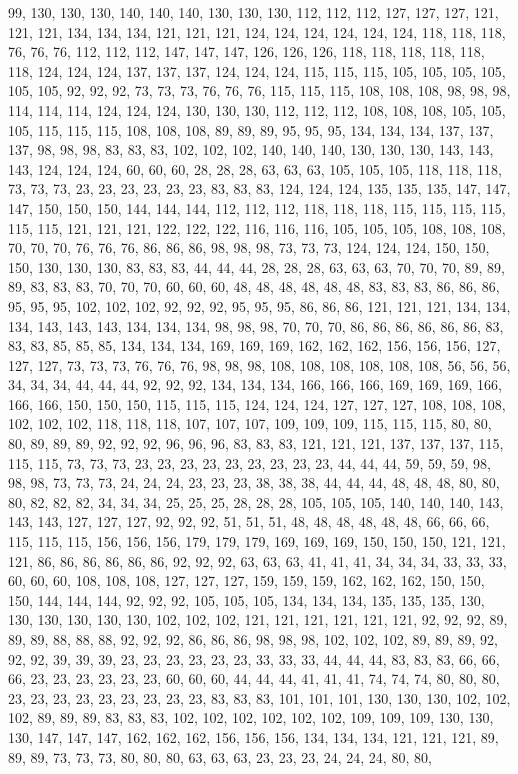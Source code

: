 99, 130, 130, 130, 140, 140, 140, 130, 130, 130, 112, 112, 112, 127, 127, 127, 121, 121, 121, 134, 134, 134, 121, 121, 121, 124, 124, 124, 124, 124, 124, 118, 118, 118, 76, 76, 76, 112, 112, 112, 147, 147, 147, 126, 126, 126, 118, 118, 118, 118, 118, 118, 124, 124, 124, 137, 137, 137, 124, 124, 124, 115, 115, 115, 105, 105, 105, 105, 105, 105, 92, 92, 92, 73, 73, 73, 76, 76, 76, 115, 115, 115, 108, 108, 108, 98, 98, 98, 114, 114, 114, 124, 124, 124, 130, 130, 130, 112, 112, 112, 108, 108, 108, 105, 105, 105, 115, 115, 115, 108, 108, 108, 89, 89, 89, 95, 95, 95, 134, 134, 134, 137, 137, 137, 98, 98, 98, 83, 83, 83, 102, 102, 102, 140, 140, 140, 130, 130, 130, 143, 143, 143, 124, 124, 124, 60, 60, 60, 28, 28, 28, 63, 63, 63, 105, 105, 105, 118, 118, 118, 73, 73, 73, 23, 23, 23, 23, 23, 23, 83, 83, 83, 124, 124, 124, 135, 135, 135, 147, 147, 147, 150, 150, 150, 144, 144, 144, 112, 112, 112, 118, 118, 118, 115, 115, 115, 115, 115, 115, 121, 121, 121, 122, 122, 122, 116, 116, 116, 105, 105, 105, 108, 108, 108, 70, 70, 70, 76, 76, 76, 86, 86, 86, 98, 98, 98, 73, 73, 73, 124, 124, 124, 150, 150, 150, 130, 130, 130, 83, 83, 83, 44, 44, 44, 28, 28, 28, 63, 63, 63, 70, 70, 70, 89, 89, 89, 83, 83, 83, 70, 70, 70, 60, 60, 60, 48, 48, 48, 48, 48, 48, 83, 83, 83, 86, 86, 86, 95, 95, 95, 102, 102, 102, 92, 92, 92, 95, 95, 95, 86, 86, 86, 121, 121, 121, 134, 134, 134, 143, 143, 143, 134, 134, 134, 98, 98, 98, 70, 70, 70, 86, 86, 86, 86, 86, 86, 83, 83, 83, 85, 85, 85, 134, 134, 134, 169, 169, 169, 162, 162, 162, 156, 156, 156, 127, 127, 127, 73, 73, 73, 76, 76, 76, 98, 98, 98, 108, 108, 108, 108, 108, 108, 56, 56, 56, 34, 34, 34, 44, 44, 44, 92, 92, 92, 134, 134, 134, 166, 166, 166, 169, 169, 169, 166, 166, 166, 150, 150, 150, 115, 115, 115, 124, 124, 124, 127, 127, 127, 108, 108, 108, 102, 102, 102, 118, 118, 118, 107, 107, 107, 109, 109, 109, 115, 115, 115, 80, 80, 80, 89, 89, 89, 92, 92, 92, 96, 96, 96, 83, 83, 83, 121, 121, 121, 137, 137, 137, 115, 115, 115, 73, 73, 73, 23, 23, 23, 23, 23, 23, 23, 23, 23, 44, 44, 44, 59, 59, 59, 98, 98, 98, 73, 73, 73, 24, 24, 24, 23, 23, 23, 38, 38, 38, 44, 44, 44, 48, 48, 48, 80, 80, 80, 82, 82, 82, 34, 34, 34, 25, 25, 25, 28, 28, 28, 105, 105, 105, 140, 140, 140, 143, 143, 143, 127, 127, 127, 92, 92, 92, 51, 51, 51, 48, 48, 48, 48, 48, 48, 66, 66, 66, 115, 115, 115, 156, 156, 156, 179, 179, 179, 169, 169, 169, 150, 150, 150, 121, 121, 121, 86, 86, 86, 86, 86, 86, 92, 92, 92, 63, 63, 63, 41, 41, 41, 34, 34, 34, 33, 33, 33, 60, 60, 60, 108, 108, 108, 127, 127, 127, 159, 159, 159, 162, 162, 162, 150, 150, 150, 144, 144, 144, 92, 92, 92, 105, 105, 105, 134, 134, 134, 135, 135, 135, 130, 130, 130, 130, 130, 130, 102, 102, 102, 121, 121, 121, 121, 121, 121, 92, 92, 92, 89, 89, 89, 88, 88, 88, 92, 92, 92, 86, 86, 86, 98, 98, 98, 102, 102, 102, 89, 89, 89, 92, 92, 92, 39, 39, 39, 23, 23, 23, 23, 23, 23, 33, 33, 33, 44, 44, 44, 83, 83, 83, 66, 66, 66, 23, 23, 23, 23, 23, 23, 60, 60, 60, 44, 44, 44, 41, 41, 41, 74, 74, 74, 80, 80, 80, 23, 23, 23, 23, 23, 23, 23, 23, 23, 83, 83, 83, 101, 101, 101, 130, 130, 130, 102, 102, 102, 89, 89, 89, 83, 83, 83, 102, 102, 102, 102, 102, 102, 109, 109, 109, 130, 130, 130, 147, 147, 147, 162, 162, 162, 156, 156, 156, 134, 134, 134, 121, 121, 121, 89, 89, 89, 73, 73, 73, 80, 80, 80, 63, 63, 63, 23, 23, 23, 24, 24, 24, 80, 80, 